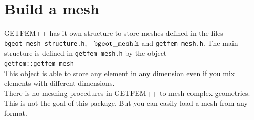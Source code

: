 \documentclass[11pt,a4paper]{article}
\begin{document}
\newpage
\tableofcontents
\newpage

\section{Build a mesh}
GETFEM++ has it own structure to store meshes defined in the files {\tt bgeot\_mesh\_structure.h}, $\;$ ${\tt bgeot\_mesh.h}$ and {\tt getfem\_mesh.h}. The main structure is defined in {\tt getfem\_mesh.h} by the object\\[0.5cm]
{\tt getfem::getfem\_mesh }\\[0.5cm]
This object is able to store any element in any dimension even if you mix elements with different dimensions.\\[0.5cm]

There is no meshing procedures in GETFEM++ to mesh complex geometries. This is not the goal of this package. But you can easily load a mesh from any format.
\end{document}
